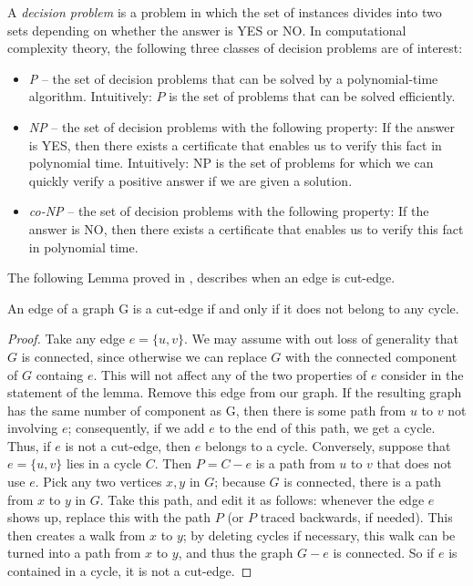 \documentclass[12pt,a4paper,titlepage,openany]{report}
\begin{document}
A \textit{decision problem} is a problem in which the set of instances divides into two sets depending on whether the answer is YES or NO.
In computational complexity theory, the following three classes of decision problems are of interest:
\begin{itemize}
\item {\it P} -- the set of decision problems that can be solved by a polynomial-time algorithm. Intuitively: $P$ is the set of problems that can be solved efficiently.
\item {\it NP} -- the set of decision problems with the following property:
If the answer is YES, then there exists a certificate that
enables us to verify this fact in polynomial time. Intuitively: NP is the set of problems for which we can
quickly verify a positive answer if we are given a solution.
\item {\it co-NP} -- the set of decision problems with the following property:
If the answer is NO, then there exists a certificate that
enables us to verify this fact in polynomial time.
\end{itemize}
The following Lemma proved in \cite{Douglas}, describes when an edge is cut-edge.
\begin{lemma}\label{cutedgecycle}
An edge of a graph G is a cut-edge if and only if it does not belong to any cycle.
\end{lemma}
\begin{proof} Take any edge $e = \{u, v\}$. We may assume with out loss of generality that $G$ is connected, since otherwise we can replace $G$ with the connected component of $G$ containg $e$. This will not affect any of the two properties of $e$ consider in the statement of the lemma.  Remove this edge from our graph. If the resulting graph has the same number of component as G, then there is some path from $u$ to $v$ not involving $e$;
consequently, if we add $e$ to the end of this path, we get a cycle. Thus, if $e$ is not a cut-edge, then $e$ belongs to a cycle.\newline
Conversely, suppose that $e = \{u, v\}$ lies in a cycle $C$. Then $P=C-e$ is a path from $u$ to $v$ that does not use $e$. Pick any two vertices $x, y$ in $G$; because $G$ is connected, there is a path from $x$ to $y$ in $G$. Take this path, and edit it as follows:
whenever the edge $e$ shows up, replace this with the path $P$ (or $P$ traced backwards, if needed). This then creates a walk from $x$ to $y$; by deleting cycles if necessary, this walk can be turned into a path from $x$ to $y$, and thus the graph $G-e$ is connected. So if $e$ is contained in a cycle, it is not a cut-edge.
\end{proof}
\end{document}
